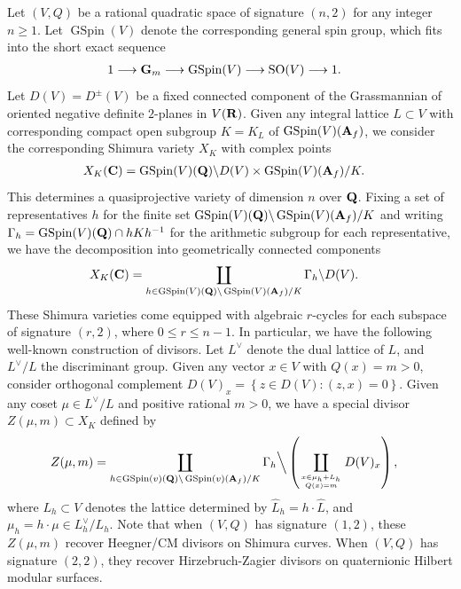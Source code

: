 \documentclass{amsart}
\theoremstyle{definition}
\theoremstyle{definition}
\theoremstyle{definition}
\begin{document}
Let $(V, Q)$ be a rational quadratic space of signature $(n,2)$ for any integer $n \geq 1$. 
Let $\operatorname{GSpin}(V)$ denote the corresponding general spin group, which fits into the short exact sequence 
\begin{align*} 1 &\longrightarrow {\bf{G}}_m \longrightarrow \operatorname{GSpin}(V) \longrightarrow \operatorname{SO}(V) \longrightarrow 1. \end{align*}
Let $D(V) = D^{\pm}(V)$ be a fixed connected component of the Grassmannian of oriented negative definite $2$-planes in $V({\bf{R}})$.
Given any integral lattice $L \subset V$ with corresponding compact open subgroup $K = K_L$ of $\operatorname{GSpin}(V)({\bf{A}}_f)$,
we consider the corresponding Shimura variety $X_K$ with complex points 
\begin{align*} X_K({\bf{C}}) &= \operatorname{GSpin}(V)({\bf{Q}}) \backslash D(V) \times \operatorname{GSpin}(V)({\bf{A}}_f)/K. \end{align*}
This determines a quasiprojective variety of dimension $n$ over ${\bf{Q}}$. 
Fixing a set of representatives $h$ for the finite set $\operatorname{GSpin}(V)({\bf{Q}}) \backslash \operatorname{GSpin}(V)({\bf{A}}_f)/K$ and writing 
$\Gamma_h = \operatorname{GSpin}(V)({\bf{Q}}) \cap h K h^{-1}$ for the arithmetic subgroup for each 
representative, we have the decomposition into geometrically connected components
\begin{align*} X_K({\bf{C}}) &= \coprod\limits_{h \in \operatorname{GSpin}(V)({\bf{Q}}) \backslash \operatorname{GSpin}(V)({\bf{A}}_f)/K} \Gamma_h \backslash D(V). \end{align*}
These Shimura varieties come equipped with algebraic $r$-cycles for each subspace of signature $(r, 2)$, where $0 \leq r \leq n-1$.
In particular, we have the following well-known construction of divisors. Let $L^{\vee}$ denote the dual lattice of $L$, and $L^{\vee}/L$ the discriminant group. 
Given any vector $x \in V$ with $Q(x) = m >0$, consider orthogonal complement $D(V)_x = \left\lbrace z \in D(V) : (z, x) =0 \right\rbrace$. 
Given any coset $\mu \in L^{\vee}/L$ and positive rational $m >0$, we have a special divisor $Z(\mu, m) \subset X_K$ defined by 
\begin{align*} Z(\mu, m) &= \coprod\limits_{ h \in \operatorname{GSpin}(v)({\bf{Q}}) \backslash \operatorname{GSpin}(v)({\bf{A}}_f) /K } \Gamma_h 
\Big\backslash \left(  \coprod\limits_{ x \in \mu_h + L_h \atop Q(x) = m } D(V)_x \right), \end{align*} 
where $L_h \subset V$ denotes the lattice determined by $\widehat{L}_h = h \cdot \widehat{L}$,
and $\mu_h = h \cdot \mu \in L_h^{\vee}/L_h$. Note that when $(V, Q)$ has signature $(1,2)$, these $Z(\mu, m)$ recover Heegner/CM divisors on Shimura curves. 
When $(V,Q)$ has signature $(2,2)$, they recover Hirzebruch-Zagier divisors on quaternionic Hilbert modular surfaces.
\end{document}
